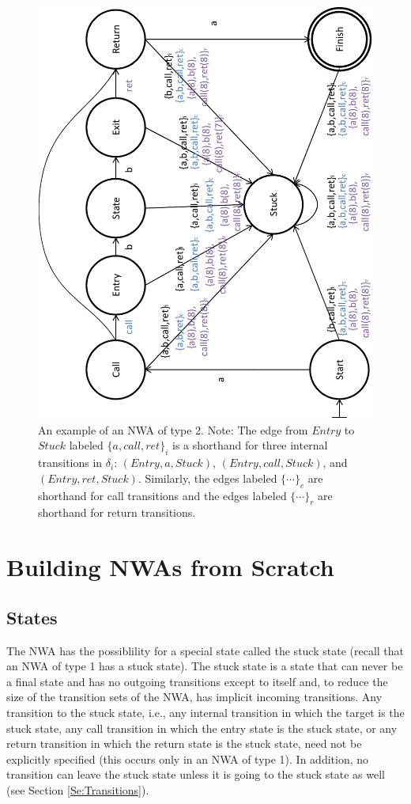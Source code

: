 \documentclass{llncs}
\begin{document}
\begin{figure}[htb]
  \centering
    \includegraphics[width=12cm]{Figures/Figure2}
  \caption{An example of an NWA of type 2.  Note: The edge from $Entry$ to $Stuck$ labeled $\{a,call,ret\}_i$ is a shorthand for three internal transitions in $\delta_i$: $(Entry,a,Stuck)$, $(Entry,call,Stuck)$, and $(Entry,ret,Stuck)$.  Similarly, the edges labeled $\{\cdots\}_c$ are shorthand for call transitions and the edges labeled $\{\cdots\}_r$ are shorthand for return transitions.}  
  \label{Fig:Example2}
\end{figure}


\section{Building NWAs from Scratch}
\label{Se:Scratch}

\subsection{States}
\label{Se:States}

The NWA has the possiblility for a special state called the stuck state (recall that an NWA of type 1 has a stuck state).  The stuck state is a state that can never be a final state and has no outgoing transitions except to itself and, to reduce the size of the transition sets of the NWA, has implicit incoming transitions.  Any transition to the stuck state, i.e., any internal transition in which the target is the stuck state, any call transition in which the entry state is the stuck state, or any return transition in which the return state is the stuck state, need not be explicitly specified (this occurs only in an NWA of type 1).  In addition, no transition can leave the stuck state unless it is going to the stuck state as well (see Section \ref{Se:Transitions}). \\
\end{document}
